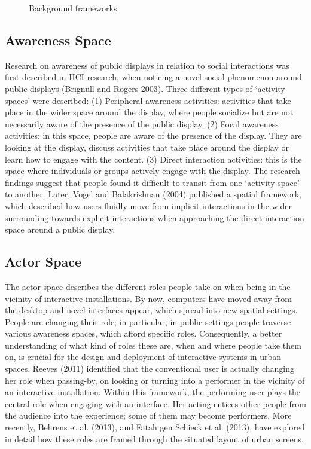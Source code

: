 \begin{figure}[htp]
\centering
\caption{Background frameworks}
\label{fig:lion}
\end{figure}

\subsection* {Awareness Space}
Research on awareness of public displays in relation to social interactions was first
described in HCI research, when noticing a novel social phenomenon around public
displays (Brignull and Rogers 2003). Three different types of ‘activity spaces’
were described: (1) Peripheral awareness activities: activities that take place in
the wider space around the display, where people socialize but are not necessarily
aware of the presence of the public display. (2) Focal awareness activities: in
this space, people are aware of the presence of the display. They are looking at the
display, discuss activities that take place around the display or learn how to engage
with the content. (3) Direct interaction activities: this is the space where individuals
or groups actively engage with the display. The research findings suggest that
people found it difficult to transit from one ‘activity space’ to another.
Later, Vogel and Balakrishnan (2004) published a spatial framework, which
described how users fluidly move from implicit interactions in the wider surrounding
towards explicit interactions when approaching the direct interaction space
around a public display.

\subsection* {Actor Space}
The actor space describes the different roles people take on when being in the
vicinity of interactive installations. By now, computers have moved away from
the desktop and novel interfaces appear, which spread into new spatial settings.
People are changing their role; in particular, in public settings people traverse
various awareness spaces, which afford specific roles. Consequently, a better understanding of what kind of roles these are, when and where people take them
on, is crucial for the design and deployment of interactive systems in urban spaces.
Reeves (2011) identified that the conventional user is actually changing her role
when passing-by, on looking or turning into a performer in the vicinity of an
interactive installation. Within this framework, the performing user plays the central
role when engaging with an interface. Her acting entices other people from
the audience into the experience; some of them may become performers. More
recently, Behrens et al. (2013), and Fatah gen Schieck et al. (2013), have explored
in detail how these roles are framed through the situated layout of urban screens.

